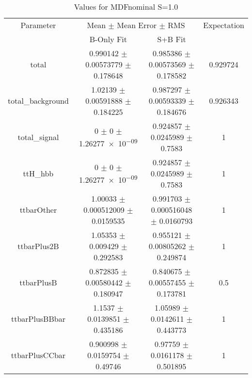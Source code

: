 \begin{table}
\centering
\caption{Values for MDFnominal S=1.0}
\begin{tabular}{cccc}
\toprule
Parameter & \multicolumn{2}{c}{Mean $\pm$ Mean Error $\pm$ RMS} & Expectation\\
 & B-Only Fit & S+B Fit & \\
\midrule
total & \num{0.990142} $\pm$ \num{0.00573779} $\pm$ \num{0.178648} & \num{0.985386} $\pm$ \num{0.00573569} $\pm$ \num{0.178582} & \num{0.929724}\\
total\_background & \num{1.02139} $\pm$ \num{0.00591888} $\pm$ \num{0.184225} & \num{0.987297} $\pm$ \num{0.00593339} $\pm$ \num{0.184676} & \num{0.926343}\\
total\_signal & \num{0} $\pm$ \num{0} $\pm$ \num{1.26277e-09} & \num{0.924857} $\pm$ \num{0.0245989} $\pm$ \num{0.7583} & \num{1}\\
ttH\_hbb & \num{0} $\pm$ \num{0} $\pm$ \num{1.26277e-09} & \num{0.924857} $\pm$ \num{0.0245989} $\pm$ \num{0.7583} & \num{1}\\
ttbarOther & \num{1.00033} $\pm$ \num{0.000512009} $\pm$ \num{0.0159535} & \num{0.991703} $\pm$ \num{0.000516048} $\pm$ \num{0.0160793} & \num{1}\\
ttbarPlus2B & \num{1.05353} $\pm$ \num{0.009429} $\pm$ \num{0.292583} & \num{0.955121} $\pm$ \num{0.00805262} $\pm$ \num{0.249874} & \num{1}\\
ttbarPlusB & \num{0.872835} $\pm$ \num{0.00580442} $\pm$ \num{0.180947} & \num{0.840675} $\pm$ \num{0.00557455} $\pm$ \num{0.173781} & \num{0.5}\\
ttbarPlusBBbar & \num{1.1537} $\pm$ \num{0.0139851} $\pm$ \num{0.435186} & \num{1.05989} $\pm$ \num{0.0142611} $\pm$ \num{0.443773} & \num{1}\\
ttbarPlusCCbar & \num{0.900998} $\pm$ \num{0.0159754} $\pm$ \num{0.49746} & \num{0.97759} $\pm$ \num{0.0161178} $\pm$ \num{0.501895} & \num{1}\\
\bottomrule
\end{tabular}
\end{table}